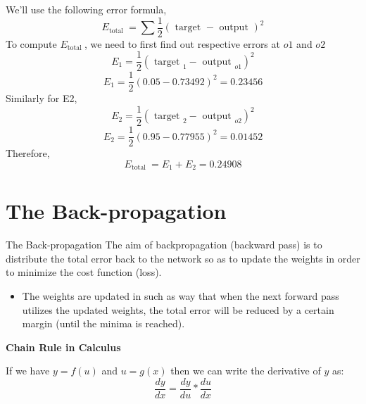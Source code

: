 \documentclass[8pt,dvipsnames]{beamer}
\begin{document}
\begin{frame}
	We'll use the following error formula,
	$$
	E_{\text {total }}=\sum \frac{1}{2}(\text { target }- \text { output })^{2}
	$$
	To compute \(E_{\text {total }}\), we need to first find out respective errors at \(o 1\)
	and \(o 2\)
	$$
	E_{1}=\frac{1}{2}\left(\text { target }_{1}-\text { output }_{o 1}\right)^{2}
	$$
	$$
	E_{1}=\frac{1}{2}(0.05-0.73492)^{2}=0.23456
	$$
	Similarly for E2,
	$$
	E_{2}=\frac{1}{2}\left(\text { target }_{2}-\text { output }_{o 2}\right)^{2}
	$$
	$$
	E_{2}=\frac{1}{2}(0.95-0.77955)^{2}=0.01452
	$$
	Therefore,
	$$
	E_{\text {total }}=E_{1}+E_{2}=0.24908
	$$
\end{frame}

\section{The Back-propagation}
\begin{frame}{The Back-propagation}
	The aim of backpropagation (backward pass) is to distribute the total error back to the network so as to update the weights in order to minimize the cost function (loss). 
	\begin{itemize}
		\item The weights are updated in such as way that when the next forward pass utilizes the updated weights, the total error will be reduced by a certain margin (until the minima is reached).
	\end{itemize}
	\textbf{Chain Rule in Calculus}
	
	If we have \(y=f(u)\) and \(u=g(x)\) then we can write the derivative of \(y\) as:
	$$
	\frac{d y}{d x}=\frac{d y}{d u} * \frac{d u}{d x}
	$$
\end{frame}
\end{document}
